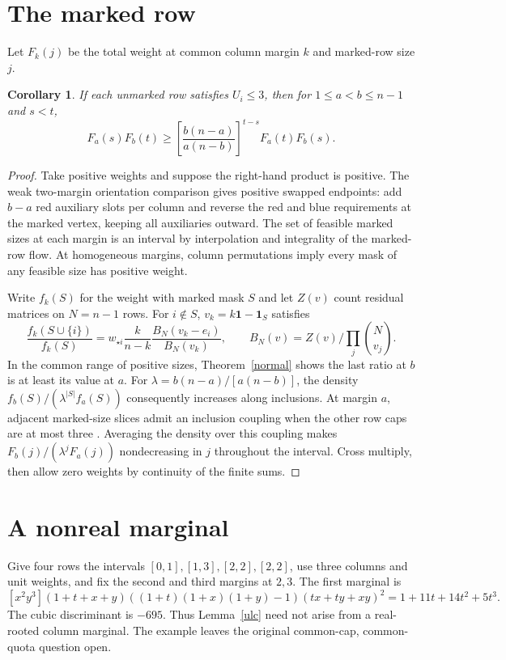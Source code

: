 \documentclass[11pt]{article}
\newtheorem{corollary}[theorem]{Corollary}
\newcommand{\bone}{\mathbf{1}}
\begin{document}
\section{The marked row}
Let $F_k(j)$ be the total weight at common column margin $k$ and marked-row size $j$.
\begin{corollary}
If each unmarked row satisfies $U_i\le3$, then for $1\le a<b\le n-1$ and $s<t$,
\[
 F_a(s)F_b(t)\ge
 \left[\frac{b(n-a)}{a(n-b)}\right]^{t-s} F_a(t)F_b(s).
\]
\end{corollary}
\begin{proof}
Take positive weights and suppose the right-hand product is positive. The weak two-margin orientation comparison \cite{marked} gives positive swapped endpoints: add $b-a$ red auxiliary slots per column and reverse the red and blue requirements at the marked vertex, keeping all auxiliaries outward. The set of feasible marked sizes at each margin is an interval by interpolation and integrality of the marked-row flow. At homogeneous margins, column permutations imply every mask of any feasible size has positive weight.

Write $f_k(S)$ for the weight with marked mask $S$ and let $Z(v)$ count residual matrices on $N=n-1$ rows. For $i\notin S$, $v_k=k\bone-\bone_S$ satisfies
\[
 \frac{f_k(S\cup\{i\})}{f_k(S)}
 =w_{\star i}\frac{k}{n-k}\frac{B_N(v_k-e_i)}{B_N(v_k)},\qquad
 B_N(v)=Z(v)\bigg/\prod_j\binom N{v_j}.
\]
In the common range of positive sizes, Theorem~\ref{normal} shows the last ratio at $b$ is at least its value at $a$. For $\lambda=b(n-a)/[a(n-b)]$, the density $f_b(S)/(\lambda^{|S|}f_a(S))$ consequently increases along inclusions. At margin $a$, adjacent marked-size slices admit an inclusion coupling when the other row caps are at most three \cite{marked,chan}. Averaging the density over this coupling makes $F_b(j)/(\lambda^j F_a(j))$ nondecreasing in $j$ throughout the interval. Cross multiply, then allow zero weights by continuity of the finite sums.
\end{proof}

\section{A nonreal marginal}
Give four rows the intervals $[0,1],[1,3],[2,2],[2,2]$, use three columns and unit weights, and fix the second and third margins at $2,3$. The first marginal is
\[
 [x^2y^3](1+t+x+y)((1+t)(1+x)(1+y)-1)(tx+ty+xy)^2
 =1+11t+14t^2+5t^3.
\]
The cubic discriminant is $-695$. Thus Lemma~\ref{ulc} need not arise from a real-rooted column marginal. The example leaves the original common-cap, common-quota question open.
\end{document}
